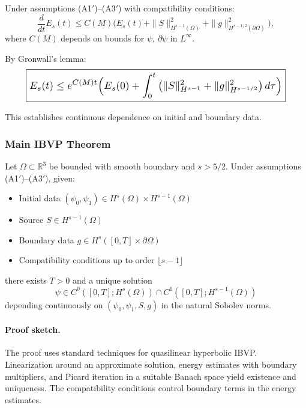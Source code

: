 Under assumptions (A1$'$)--(A3$'$) with compatibility conditions:
\begin{equation}
\frac{d}{dt}E_s(t) \leq C(M)\big(E_s(t) + \|S\|^2_{H^{s-1}(\Omega)} 
+ \|g\|^2_{H^{s-1/2}(\partial\Omega)}\big),
\label{eq:energy-differential}
\end{equation}
where $C(M)$ depends on bounds for $\psi$, $\partial\psi$ in $L^\infty$.

By Gronwall's lemma:
\begin{equation}
\resizebox{0.9\columnwidth}{!}{$\displaystyle
\boxed{
E_s(t) \leq e^{C(M)t}\Big(E_s(0) + \int_0^t \big(\|S\|^2_{H^{s-1}} + \|g\|^2_{H^{s-1/2}}\big)\,d\tau\Big)
}
$}
\label{eq:gronwall-bound}
\end{equation}

This establishes continuous dependence on initial and boundary data.

\subsubsection{Main IBVP Theorem}

\begin{theorem}\label{thm:ibvp}
Let $\Omega \subset \mathbb{R}^3$ be bounded with smooth boundary and 
$s > 5/2$. Under assumptions (A1$'$)--(A3$'$), given:
\begin{itemize}
\item Initial data $(\psi_0, \psi_1) \in H^s(\Omega) \times H^{s-1}(\Omega)$
\item Source $S \in H^{s-1}(\Omega)$
\item Boundary data $g \in H^s([0,T] \times \partial\Omega)$
\item Compatibility conditions up to order $\lfloor s - 1 \rfloor$
\end{itemize}
there exists $T > 0$ and a unique solution
\begin{equation}
\psi \in C^0([0,T]; H^s(\Omega)) \cap C^1([0,T]; H^{s-1}(\Omega))
\end{equation}
depending continuously on $(\psi_0, \psi_1, S, g)$ in the natural Sobolev norms.
\end{theorem}

\paragraph{Proof sketch.}
The proof uses standard techniques for quasilinear hyperbolic IBVP. 
Linearization around an approximate solution, energy estimates with 
boundary multipliers, and Picard iteration in a suitable Banach space 
yield existence and uniqueness. The compatibility conditions control 
boundary terms in the energy estimates.

